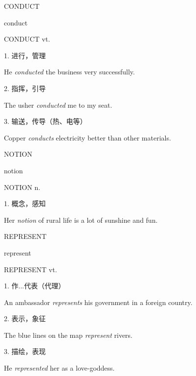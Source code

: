 \begin{flashcard}{
CONDUCT

conduct
}
\begin{center}
CONDUCT vt. 
\end{center}
1. 进行，管理

He \textit{conducted} the business very successfully.

2. 指挥，引导

The usher \textit{conducted} me to my seat.

3. 输送，传导（热、电等）

Copper \textit{conducts} electricity better than other materials.

\end{flashcard}
\begin{flashcard}{
NOTION

notion
}
\begin{center}
NOTION n. 
\end{center}
1. 概念，感知

Her \textit{notion} of rural life is a lot of sunshine and fun.

\end{flashcard}
\begin{flashcard}{
REPRESENT

represent
}
\begin{center}
REPRESENT vt. 
\end{center}
1. 作...代表（代理）

An ambassador \textit{represents} his government in a foreign country.

2. 表示，象征

The blue lines on the map \textit{represent} rivers.

3. 描绘，表现

He \textit{represented} her as a love-goddess.

\end{flashcard}

